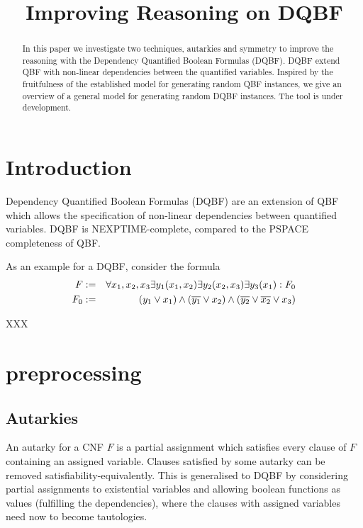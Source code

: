\documentclass[conference]{IEEEtran}
\begin{document}
\title{Improving Reasoning on DQBF}


\author{
}

\maketitle

\begin{abstract}
In this paper we investigate two techniques, autarkies and symmetry to improve the reasoning with the Dependency Quantified Boolean Formulas (DQBF).
%
DQBF extend QBF with non-linear dependencies between the quantified variables.
%
Inspired by the fruitfulness of the established model for generating
random QBF instances, we give an overview of a general model for generating random DQBF instances.	
%
The tool is under development. 
%    
\end{abstract}



\section{Introduction}
\label{sec:Intro}
Dependency Quantified Boolean Formulas (DQBF) are an extension of QBF
which allows the specification of non-linear dependencies between quantified variables. 
%
DQBF is NEXPTIME-complete, compared to the PSPACE completeness of QBF.

As an example for a DQBF, consider the formula
\begin{eqnarray*}
	F & := & \forall x_1,x_2,x_3 \exists y_1(x_1,x_2) \exists y_2(x_2,x_3) \exists y_3(x_1): F_0\\
	F_0 & := & (y_1 \vee x_1) \wedge (\overline{y_1} \vee x_2) \wedge (\overline{y_2} \vee \overline{x_2} \vee x_3) 
\end{eqnarray*}

XXX
\section{preprocessing}
\label{sec:pre}

\subsection{Autarkies}
\label{sec:aut}
An autarky for a CNF $F$ is a partial assignment which satisfies every clause of $F$ containing an assigned variable. 
%
Clauses satisfied by some autarky can be removed satisfiability-equivalently. 
%
This is generalised to DQBF by considering partial assignments to existential variables and allowing boolean functions as values (fulfilling the dependencies), where the clauses with assigned variables need now to become tautologies.
%
\end{document}
